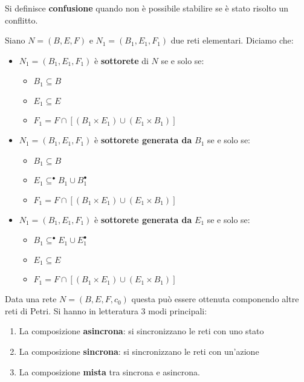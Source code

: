 Si definisce \textbf{confusione} quando non è possibile stabilire se è stato
risolto un conflitto.
\begin{definizione}
    Siano $N = (B, E, F)$ e $N_1 = (B_1, E_1, F_1)$ due reti elementari. Diciamo che:
    \begin{itemize}
        \item $N_1 = (B_1, E_1, F_1)$ è \textbf{sottorete} di $N$ se e solo se:
              \begin{itemize}
                  \item $B_1 \subseteq B$
                  \item $E_1 \subseteq E$
                  \item $F_1 = F \cap [(B_1 \times E_1) \cup (E_1 \times B_1)]$
              \end{itemize}
        \item $N_1 = (B_1, E_1, F_1)$ è \textbf{sottorete generata da} $B_1$ se e solo se:
              \begin{itemize}
                  \item $B_1 \subseteq B$
                  \item $E_1 \subseteq ^{\bullet} B_1 \cup B_1^{\bullet}$
                  \item $F_1 = F \cap [(B_1 \times E_1) \cup (E_1 \times B_1)]$
              \end{itemize}
        \item $N_1 = (B_1, E_1, F_1)$ è \textbf{sottorete generata da} $E_1$ se e solo se:
              \begin{itemize}
                  \item $B_1 \subseteq ^{\bullet} E_1 \cup E_1^{\bullet}$
                  \item $E_1 \subseteq E$
                  \item $F_1 = F \cap [(B_1 \times E_1) \cup (E_1 \times B_1)]$
              \end{itemize}
    \end{itemize}
\end{definizione}
Data una rete $N = (B,E, F, c_0)$ questa può essere ottenuta componendo altre
reti di Petri. Si hanno in letteratura 3 modi principali:
\begin{enumerate}
    \item La composizione \textbf{asincrona}: si sincronizzano le reti con uno stato
    \item La composizione \textbf{sincrona}: si sincronizzano le reti con un'azione
    \item La composizione \textbf{mista} tra sincrona e asincrona.
\end{enumerate}
